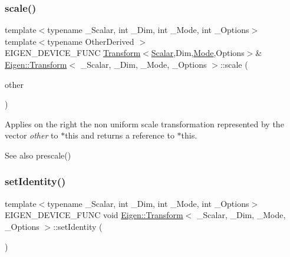 \subsubsection{\texorpdfstring{scale()}{scale()}\hspace{0.1cm}{\footnotesize\ttfamily [2/2]}}
{\footnotesize\ttfamily template$<$typename \+\_\+\+Scalar, int \+\_\+\+Dim, int \+\_\+\+Mode, int \+\_\+\+Options$>$ \\
template$<$typename Other\+Derived $>$ \\
E\+I\+G\+E\+N\+\_\+\+D\+E\+V\+I\+C\+E\+\_\+\+F\+U\+NC \mbox{\hyperlink{class_eigen_1_1_transform}{Transform}}$<$\mbox{\hyperlink{class_eigen_1_1_transform_a4e69ced9d651745b8ed4eda46f41795d}{Scalar}},Dim,\mbox{\hyperlink{struct_mode}{Mode}},Options$>$\& \mbox{\hyperlink{class_eigen_1_1_transform}{Eigen\+::\+Transform}}$<$ \+\_\+\+Scalar, \+\_\+\+Dim, \+\_\+\+Mode, \+\_\+\+Options $>$\+::scale (\begin{DoxyParamCaption}\item[{const \mbox{\hyperlink{class_eigen_1_1_matrix_base}{Matrix\+Base}}$<$ Other\+Derived $>$ \&}]{other }\end{DoxyParamCaption})}

Applies on the right the non uniform scale transformation represented by the vector {\itshape other} to {\ttfamily $\ast$this} and returns a reference to {\ttfamily $\ast$this}. \begin{DoxySeeAlso}{See also}
prescale() 
\end{DoxySeeAlso}
\mbox{\label{class_eigen_1_1_transform_a4f0c6b74994904b56b621cf3d9ac4a0f}} 
\subsubsection{\texorpdfstring{setIdentity()}{setIdentity()}}
{\footnotesize\ttfamily template$<$typename \+\_\+\+Scalar, int \+\_\+\+Dim, int \+\_\+\+Mode, int \+\_\+\+Options$>$ \\
E\+I\+G\+E\+N\+\_\+\+D\+E\+V\+I\+C\+E\+\_\+\+F\+U\+NC void \mbox{\hyperlink{class_eigen_1_1_transform}{Eigen\+::\+Transform}}$<$ \+\_\+\+Scalar, \+\_\+\+Dim, \+\_\+\+Mode, \+\_\+\+Options $>$\+::set\+Identity (\begin{DoxyParamCaption}{ }\end{DoxyParamCaption})\hspace{0.3cm}{\ttfamily [inline]}}

